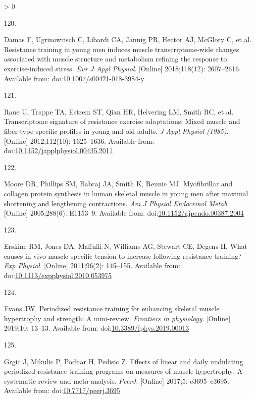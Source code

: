 \documentclass[twoside,10pt]{gihclass} %
\newlength{\cslhangindent}
\newlength{\csllabelwidth}
\newenvironment{CSLReferences}[3] %
 {%
  \setlength{\parindent}{0pt}
  \ifodd #1 \everypar{\setlength{\hangindent}{\cslhangindent}}\ignorespaces\fi
  \ifnum #2 > 0
  \setlength{\parskip}{#2\baselineskip}
  \fi
 }%
 {}
\newcommand{\CSLLeftMargin}[1]{\parbox[t]{\maxof{\widthof{#1}}{\csllabelwidth}}{#1}}
\newcommand{\CSLRightInline}[1]{\parbox[t]{\linewidth}{#1}}
\begin{document}
\begin{CSLReferences}{0}{0}
\leavevmode\hypertarget{ref-RN2298}{}%
\CSLLeftMargin{120. }
\CSLRightInline{Damas F, Ugrinowitsch C, Libardi CA, Jannig PR, Hector AJ, McGlory C, et al. Resistance training in young men induces muscle transcriptome-wide changes associated with muscle structure and metabolism refining the response to exercise-induced stress. \emph{Eur J Appl Physiol}. {[}Online{]} 2018;118(12): 2607--2616. Available from: doi:\href{https://doi.org/10.1007/s00421-018-3984-y}{10.1007/s00421-018-3984-y}}

\leavevmode\hypertarget{ref-RN774}{}%
\CSLLeftMargin{121. }
\CSLRightInline{Raue U, Trappe TA, Estrem ST, Qian HR, Helvering LM, Smith RC, et al. Transcriptome signature of resistance exercise adaptations: Mixed muscle and fiber type specific profiles in young and old adults. \emph{J Appl Physiol (1985)}. {[}Online{]} 2012;112(10): 1625--1636. Available from: doi:\href{https://doi.org/10.1152/japplphysiol.00435.2011}{10.1152/japplphysiol.00435.2011}}

\leavevmode\hypertarget{ref-RN2457}{}%
\CSLLeftMargin{122. }
\CSLRightInline{Moore DR, Phillips SM, Babraj JA, Smith K, Rennie MJ. Myofibrillar and collagen protein synthesis in human skeletal muscle in young men after maximal shortening and lengthening contractions. \emph{Am J Physiol Endocrinol Metab}. {[}Online{]} 2005;288(6): E1153--9. Available from: doi:\href{https://doi.org/10.1152/ajpendo.00387.2004}{10.1152/ajpendo.00387.2004}}

\leavevmode\hypertarget{ref-RN1504}{}%
\CSLLeftMargin{123. }
\CSLRightInline{Erskine RM, Jones DA, Maffulli N, Williams AG, Stewart CE, Degens H. What causes in vivo muscle specific tension to increase following resistance training? \emph{Exp Physiol}. {[}Online{]} 2011;96(2): 145--155. Available from: doi:\href{https://doi.org/10.1113/expphysiol.2010.053975}{10.1113/expphysiol.2010.053975}}

\leavevmode\hypertarget{ref-RN2575}{}%
\CSLLeftMargin{124. }
\CSLRightInline{Evans JW. Periodized resistance training for enhancing skeletal muscle hypertrophy and strength: A mini-review. \emph{Frontiers in physiology}. {[}Online{]} 2019;10: 13--13. Available from: doi:\href{https://doi.org/10.3389/fphys.2019.00013}{10.3389/fphys.2019.00013}}

\leavevmode\hypertarget{ref-RN2572}{}%
\CSLLeftMargin{125. }
\CSLRightInline{Grgic J, Mikulic P, Podnar H, Pedisic Z. Effects of linear and daily undulating periodized resistance training programs on measures of muscle hypertrophy: A systematic review and meta-analysis. \emph{PeerJ}. {[}Online{]} 2017;5: e3695--e3695. Available from: doi:\href{https://doi.org/10.7717/peerj.3695}{10.7717/peerj.3695}}


\end{CSLReferences}
\end{document}
